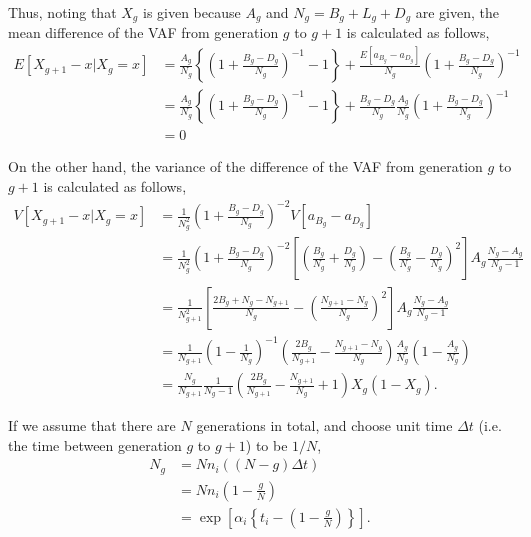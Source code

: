\documentclass{article}
\begin{document}
Thus, noting that $X_g$ is given because $A_g$ and $N_g = B_g + L_g + D_g$ are given, the mean difference of the VAF from generation $g$ to $g+1$ is calculated as follows,
\begin{align}
 E[X_{g+1} - x | X_{g}=x] & = \frac{A_g}{N_g} \left\{ \left(1 + \frac{B_g - D_g}{N_g}\right)^{-1} - 1 \right\} + \frac{ E\left[ a_{B_g} - a_{D_g} \right] }{N_g} \left( 1 + \frac{B_g - D_g}{N_g} \right)^{-1} \nonumber\label{VAF_diff_mean}\\
 & = \frac{A_g}{N_g} \left\{ \left(1 + \frac{B_g - D_g}{N_g}\right)^{-1} - 1 \right\} +  \frac{B_g - D_g}{N_g} \frac{A_g}{N_g} \left( 1 + \frac{B_g - D_g}{N_g} \right)^{-1} \nonumber\\
 & = 0
\end{align}

On the other hand, the variance of the difference of the VAF from generation $g$ to $g+1$ is calculated as follows,
\begin{align}
 V[X_{g+1} - x | X_{g}=x] & = \frac{1}{N_g^2} \left(1 + \frac{B_g - D_g}{N_g}\right)^{-2} V[a_{B_g} - a_{D_g}] \nonumber\\
 & = \frac{1}{N_g^2} \left(1 + \frac{B_g - D_g}{N_g}\right)^{-2} \left[ \left( \frac{B_g}{N_g} + \frac{D_g}{N_g} \right) - \left( \frac{B_g}{N_g} - \frac{D_g}{N_g} \right)^2 \right] A_g \frac{N_g - A_g}{N_g - 1} \nonumber\\
 & = \frac{1}{N_{g+1}^2} \left[ \frac{2B_g + N_g - N_{g+1}}{N_g} - \left( \frac{N_{g+1} - N_g}{N_g} \right)^2 \right] A_g \frac{N_g - A_g}{N_g - 1} \nonumber\\
 & = \frac{1}{N_{g+1}} \left(1 - \frac{1}{N_g}\right)^{-1} \left( \frac{2B_g}{N_{g+1}} - \frac{N_{g+1} - N_g}{N_g} \right) \frac{A_g}{N_g} \left(1 - \frac{A_g}{N_g} \right) \nonumber\\
 & = \frac{N_g}{N_{g+1}} \frac{1}{N_g - 1} \left( \frac{2B_g}{N_{g+1}} - \frac{N_{g+1}}{N_g} + 1 \right) X_g \left(1 - X_g \right).
\end{align}

If we assume that there are $N$ generations in total, and choose unit time $\varDelta t$ (i.e. the time between generation $g$ to $g+1$) to be $1/N$, 
\begin{align}
 N_g & = Nn_i ((N - g) \varDelta t)\nonumber \\
 & = Nn_i \left(1 - \frac{g}{N}\right)\nonumber \\
 & = \exp \left[\alpha_i \left\{ t_i - \left( 1 - \frac{g}{N} \right)\right\}\right].
\end{align}
\end{document}
